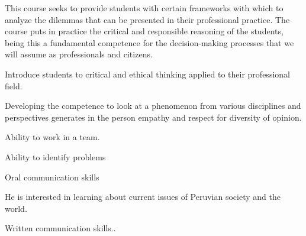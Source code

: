 \begin{syllabus}


\begin{justification}
This course seeks to provide students with certain frameworks with which to analyze the dilemmas that can be presented in their professional practice. The course puts in practice the critical and responsible reasoning of the students, being this a fundamental competence for the decision-making processes that we will assume as professionals and citizens.
\end{justification}

\begin{goals}
\item Introduce students to critical and ethical thinking applied to their professional field.
\item Developing the competence to look at a phenomenon from various disciplines and perspectives generates in the person empathy and respect for diversity of opinion.
\item Ability to work in a team.
\item Ability to identify problems
\item Oral communication skills
\item He is interested in learning about current issues of Peruvian society and the world.
\item Written communication skills..
\end{goals}

\begin{outcomes}
    \item {}
    \item {}
    \item {}
    \item {}
    \item {}
\end{outcomes}

\begin{competences}
    \item {}
    \item {}
    \item {}
    \item {}
\end{competences}


\end{syllabus}
